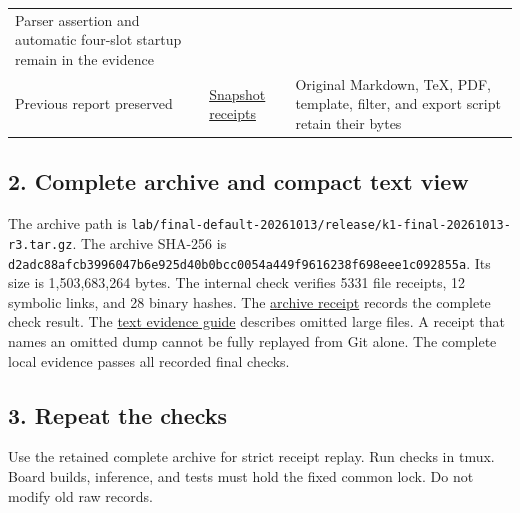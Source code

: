 \documentclass[10pt,a4paper]{article}
\begin{document}
\begin{longtable}[]{@{}lll@{}}
\begin{minipage}[t]{0.30\columnwidth}
Parser assertion and automatic four-slot startup remain in the
evidence\strut
\end{minipage}\tabularnewline
\begin{minipage}[t]{0.30\columnwidth}\raggedright
Previous report preserved\strut
\end{minipage} & \begin{minipage}[t]{0.30\columnwidth}\raggedright
\href{https://github.com/MoyaMryia/riscv-accl/blob/main/spacemit/reports/snapshots/2026-10-12/receipts.json}{Snapshot
receipts}\strut
\end{minipage} & \begin{minipage}[t]{0.30\columnwidth}\raggedright
Original Markdown, TeX, PDF, template, filter, and export script retain
their bytes\strut
\end{minipage}\tabularnewline
\bottomrule
\end{longtable}

\hypertarget{complete-archive-and-compact-text-view}{%
\subsection{2. Complete archive and compact text
view}\label{complete-archive-and-compact-text-view}}

The archive path is
\nolinkurl{lab/final-default-20261013/release/k1-final-20261013-r3.tar.gz}.
The archive SHA-256 is
\texttt{d2adc88a\allowbreak{}fcb39960\allowbreak{}47b6e925\allowbreak{}d40b0bcc\allowbreak{}0054a449\allowbreak{}f9616238\allowbreak{}f698eee1\allowbreak{}c092855a}.
Its size is 1,503,683,264 bytes. The internal check verifies 5331 file
receipts, 12 symbolic links, and 28 binary hashes. The
\href{https://github.com/MoyaMryia/riscv-accl/blob/main/spacemit/final-release/archive-receipt.json}{archive
receipt} records the complete check result. The
\href{https://github.com/MoyaMryia/riscv-accl/blob/main/spacemit/reports/raw/k1-final-default-20261014-r3/ARCHIVE.md}{text
evidence guide} describes omitted large files. A receipt that names an
omitted dump cannot be fully replayed from Git alone. The complete local
evidence passes all recorded final checks.

\hypertarget{repeat-the-checks}{%
\subsection{3. Repeat the checks}\label{repeat-the-checks}}

Use the retained complete archive for strict receipt replay. Run checks
in tmux. Board builds, inference, and tests must hold the fixed common
lock. Do not modify old raw records.
\end{document}
